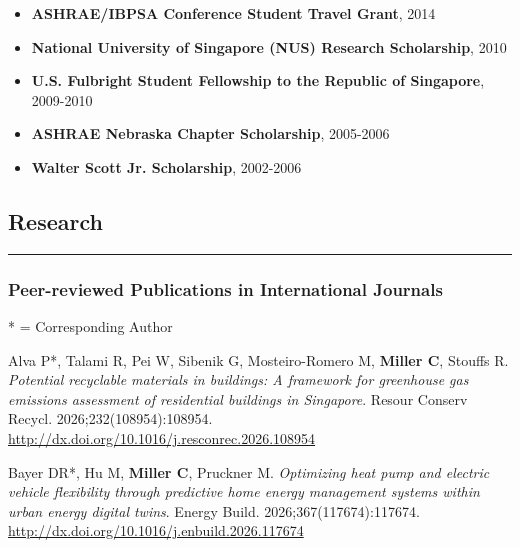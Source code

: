 \documentclass[10pt,a4paper]{article}
\begin{document}
\begin{small}
\begin{itemize}
  \item \textbf{ASHRAE/IBPSA Conference Student Travel Grant}, 2014%

  \item \textbf{National University of Singapore (NUS) Research Scholarship}, 2010%

  \item \textbf{U.S. Fulbright Student Fellowship to the Republic of Singapore}, 2009-2010%

  \item \textbf{ASHRAE Nebraska Chapter Scholarship}, 2005-2006%

  \item \textbf{Walter Scott Jr. Scholarship}, 2002-2006%


\end{itemize}





\subsection*{Research}
\hrule
\vspace{0.2cm}


\subsubsection*{Peer-reviewed Publications in International Journals}
* = Corresponding Author


\begin{etaremune}

\item 
Alva P*, Talami R, Pei W, Sibenik G, Mosteiro-Romero M, \textbf{Miller C}, Stouffs R. \emph{Potential recyclable materials in buildings: A framework for greenhouse gas emissions assessment of residential buildings in Singapore}. Resour Conserv Recycl. 2026;232(108954):108954. \url{http://dx.doi.org/10.1016/j.resconrec.2026.108954}

\item 
Bayer DR*, Hu M, \textbf{Miller C}, Pruckner M. \emph{Optimizing heat pump and electric vehicle flexibility through predictive home energy management systems within urban energy digital twins}. Energy Build. 2026;367(117674):117674. \url{http://dx.doi.org/10.1016/j.enbuild.2026.117674}
  

\end{etaremune}
\end{small}
\end{document}
